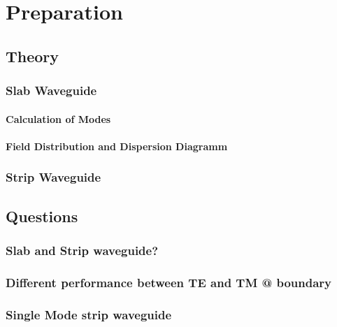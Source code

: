\chapter{Preparation}

\section{Theory}

\subsection{Slab Waveguide}
\subsubsection{Calculation of Modes}
\subsubsection{Field Distribution and Dispersion Diagramm}


\subsection{Strip Waveguide}



\section{Questions}

\subsection{Slab and Strip waveguide?}
\label{q1}

\subsection{Different performance between TE and TM @ boundary}

\subsection{Single Mode strip waveguide}

